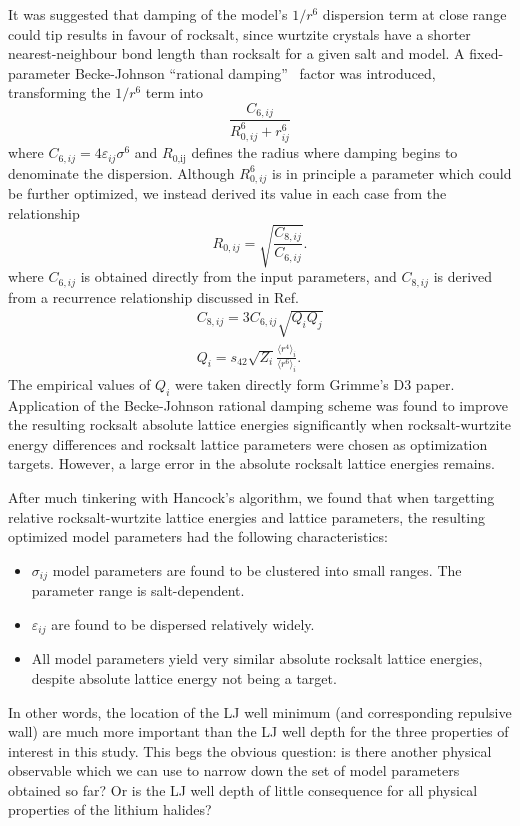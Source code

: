 \documentclass[aip,preprint,amsmath,amssymb,hidelinks]{revtex4-1}
\begin{document}
	It was suggested that damping of the model's $1/r^6$ dispersion term at close range could tip results in favour of rocksalt, since wurtzite crystals have a shorter nearest-neighbour bond length than rocksalt for a given salt and model. A fixed-parameter Becke-Johnson ``rational damping''~\cite{Becke2007,Grimme2011} factor was introduced, transforming the $1/r^6$ term into
	\begin{equation}
		\frac {  C_{6,ij} } { R _ { \text {0}, i j } ^ { 6 } + r _ { i j }^{ 6 } }
		\label{eq:Dispersion}
	\end{equation}
	where $C_{6,ij} =  4\varepsilon_{ij} \sigma^6$ and $R _ { \text {0,ij}}$ defines the radius where damping begins to denominate the dispersion. Although $R _ { \text {0}, i j } ^ { 6 }$ is in principle a parameter which could be further optimized, we instead derived its value in each case from the relationship
	\begin{equation}
		R_{0,ij} = \sqrt{\frac{C_{8,ij}}{C_{6,ij}}}.
	\end{equation}
	where $C_{6,ij}$ is obtained directly from the input parameters, and $C_{8,ij}$ is derived from a recurrence relationship discussed in Ref.~
	\begin{align}
		C_{8,ij} = 3 C_{6,ij} \sqrt{Q_{i} Q_{j}}\\
		Q_{i} = s_{42} \sqrt{Z_{i}}\frac{\langle r^{4}\rangle_{i}}{\langle r^{6}\rangle_{i}}.
	\end{align}
	The empirical values of $Q_{i}$ were taken directly form Grimme's D3 paper.~\cite{Grimme2011} Application of the Becke-Johnson rational damping scheme was found to improve the resulting rocksalt absolute lattice energies significantly when rocksalt-wurtzite energy differences and rocksalt lattice parameters were chosen as optimization targets. However, a large error in the absolute rocksalt lattice energies remains.
	
	After much tinkering with Hancock's algorithm, we found that when targetting relative rocksalt-wurtzite lattice energies and lattice parameters, the resulting optimized model parameters had the following characteristics:
	\begin{itemize}
		\item $\sigma_{ij}$ model parameters are found to be clustered into small ranges. The parameter range is salt-dependent.
		\item $\varepsilon_{ij}$ are found to be dispersed relatively widely.
		\item All model parameters yield very similar absolute rocksalt lattice energies, despite absolute lattice energy not being a target.
	\end{itemize}
	In other words, the location of the LJ well minimum (and corresponding repulsive wall) are much more important than the LJ well depth for the three properties of interest in this study. This begs the obvious question: is there another physical observable which we can use to narrow down the set of model parameters obtained so far? Or is the LJ well depth of little consequence for all physical properties of the lithium halides?
	
\end{document}
